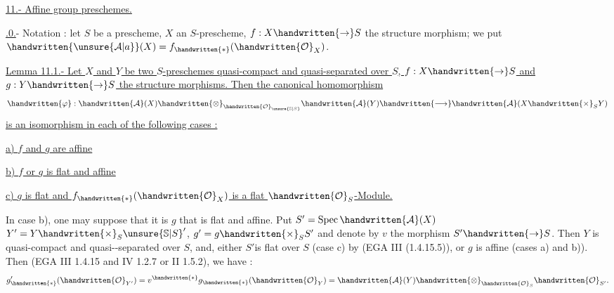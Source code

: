 \uline{11.- Affine group preschemes.}

\uline{.0.}- Notation : let $S$ be a prescheme, $X$ an $S$-prescheme, $f:X\handwritten{\to}S$ the structure morphism; we put $\handwritten{\unsure{\mathcal{A}|a}}(X)=f_{\handwritten{*}}(\handwritten{\mathcal{O}}_X)$.

\uline{Lemma 11.1.- Let $X$ and $Y$ be two $S$-preschemes quasi-compact and quasi-separated over $S$, $f:X\handwritten{\to}S$ and $g:Y\handwritten{\to}S$ the structure morphisms. Then the canonical homomorphism}
\[
\handwritten{\varphi}:\handwritten{\mathcal{A}}(X)\handwritten{\otimes}_{\handwritten{\mathcal{O}}_{\unsure{\mathbb{S}|S}}}\handwritten{\mathcal{A}}(Y)\handwritten{\longrightarrow}\handwritten{\mathcal{A}}(X\handwritten{\times}_S Y)
\]
\uline{is an isomorphism in each of the following cases :}

\uline{a) $f$ and $g$ are affine}

\uline{b) $f$ or $g$ is flat and affine}

\uline{c) $g$ is flat and $f_{\handwritten{*}}(\handwritten{\mathcal{O}}_X)$ is a flat $\handwritten{\mathcal{O}}_S$-Module.}

In case b), one may suppose that it is $g$ that is flat and affine. Put $S'=\operatorname{Spec}\handwritten{\mathcal{A}}(X)$ $Y'=Y\handwritten{\times}_S\unsure{\mathbb{S}|S}'$, $g'=g\handwritten{\times}_S S'$ and denote by $v$ the morphism $S'\handwritten{\to}S$. Then $Y$ is quasi-compact and quasi-\linebreak -separated over $S$, and, either $S'$is flat over $S$ (case c) by (EGA III (1.4.15.5)), or $g$ is affine (cases a) and b)). Then (EGA III 1.4.15 and IV 1.2.7 or II 1.5.2), we have :
\[
g'_{\handwritten{*}}(\handwritten{\mathcal{O}}_{Y'})=v^{\handwritten{*}}g_{\handwritten{*}}(\handwritten{\mathcal{O}}_Y)=\handwritten{\mathcal{A}}(Y)\handwritten{\otimes}_{\handwritten{\mathcal{O}}_S}\handwritten{\mathcal{O}}_{S'}.
\]

